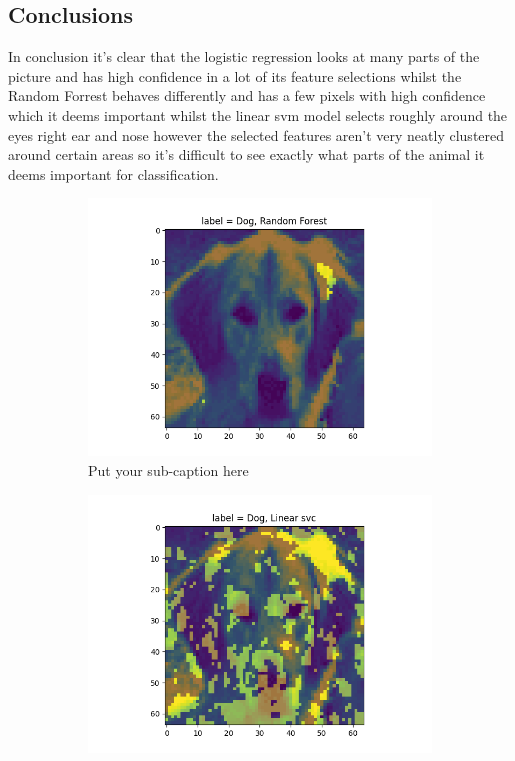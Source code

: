 \documentclass{article}
\begin{document}
\subsection{Conclusions}
In conclusion it's clear that the logistic regression looks at many parts of the picture and has high confidence in a lot of its feature selections whilst the Random Forrest behaves differently and has a few pixels with high confidence which it deems important whilst the linear svm model selects roughly around the eyes right ear and nose however the selected features aren't very neatly clustered around certain areas so it's difficult to see exactly what parts of the animal it deems important for classification. 
\begin{figure}[H]
\begin{subfigure}{.33\textwidth}
  \centering
  \includegraphics[width=1\linewidth]{1e/Dogs 2 clusters/imp feat RandomForest pic.png}  
  \caption{Put your sub-caption here}
  \label{rndf selection}
\end{subfigure}
\begin{subfigure}{.33\textwidth}
  \centering
  \includegraphics[width=1\linewidth]{1e/Dogs 2 clusters/imp_feat Linear svc.png}  

\end{subfigure}
\end{figure}
\end{document}
